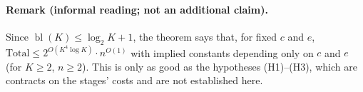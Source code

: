 \documentclass[11pt]{article}
\newcommand{\bl}{\operatorname{bl}}
\begin{document}
\paragraph{Remark (informal reading; not an additional claim).} Since $\bl(K)\le \log_2K+1$, the theorem says that, for fixed $c$ and $e$, $\mathrm{Total}\le2^{O(K^4\log K)}\cdot n^{O(1)}$ with implied constants depending only on $c$ and $e$ (for $K\ge2$, $n\ge2$). This is only as good as the hypotheses (H1)--(H3), which are contracts on the stages' costs and are not established here.
\end{document}
